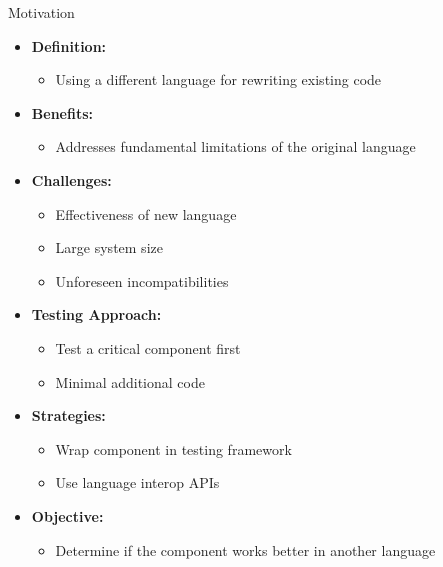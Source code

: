 \begin{frame}{Motivation}
    \begin{itemize}
        \item \textbf{Definition:}
        \begin{itemize}
            \item Using a different language for rewriting existing code
        \end{itemize}
        \pause
        \item \textbf{Benefits:}
        \begin{itemize}
            \item Addresses fundamental limitations of the original language
        \end{itemize}
        \pause
        \item \textbf{Challenges:}
        \begin{itemize}
            \item Effectiveness of new language
            \item Large system size
            \item Unforeseen incompatibilities
        \end{itemize}
        \pause
        \item \textbf{Testing Approach:}
        \begin{itemize}
            \item Test a critical component first
            \item Minimal additional code
        \end{itemize}
        \pause
        \item \textbf{Strategies:}
        \begin{itemize}
            \item Wrap component in testing framework
            \item Use language interop APIs
        \end{itemize}
        \pause
        \item \textbf{Objective:}
        \begin{itemize}
            \item Determine if the component works better in another language
        \end{itemize}
    \end{itemize}
\end{frame}